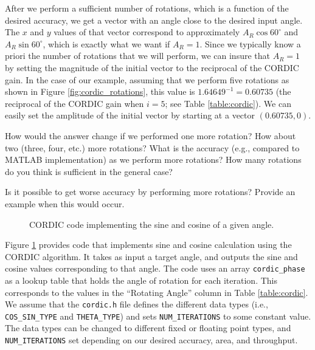 After we perform a sufficient number of rotations, which is a function of the desired accuracy, we get a vector with an angle close to the desired input angle. The $x$ and $y$ values of that vector correspond to approximately $A_R \cos 60^{\circ}$ and $A_R \sin 60^{\circ}$, which is exactly what we want if $A_R = 1$. Since we typically know a priori the number of rotations that we will perform, we can insure that $A_R = 1$ by setting the magnitude of the initial vector to the reciprocal of the CORDIC gain. In the case of our example, assuming that we perform five rotations as shown in Figure \ref{fig:cordic_rotations}, this value is $1.64649^{-1} = 0.60735$ (the reciprocal of the CORDIC gain when $i=5$; see Table \ref{table:cordic}). We can easily set the amplitude of the initial vector by starting at a vector $(0.60735, 0)$. 

\begin{exercise}
How would the answer change if we performed one more rotation? How about two (three, four, etc.) more rotations? What is the accuracy (e.g., compared to MATLAB implementation) as we perform more rotations? How many rotations do you think is sufficient in the general case?
\end{exercise}


\begin{exercise}
Is it possible to get worse accuracy by performing more rotations? Provide an example when this would occur.
\end{exercise}

\begin{figure}
\begin{scriptsize}

\end{scriptsize}
\caption{CORDIC code implementing the sine and cosine of a given angle.}
\label{fig:cordic_code}
\end{figure}

Figure \ref{fig:cordic_code} provides code that implements sine and cosine calculation using the CORDIC algorithm. It takes as input a target angle, and outputs the sine and cosine values corresponding to that angle. The code uses an array \lstinline{cordic_phase} as a lookup table that holds the angle of rotation for each iteration. This corresponds to the values in the ``Rotating Angle'' column in Table \ref{table:cordic}. We assume that the \lstinline{cordic.h} file defines the different data types (i.e., \lstinline{COS_SIN_TYPE} and \lstinline{THETA_TYPE}) and sets \lstinline{NUM_ITERATIONS} to some constant value. The data types can be changed to different fixed or floating point types, and \lstinline{NUM_ITERATIONS} set depending on our desired accuracy, area, and throughput. 

